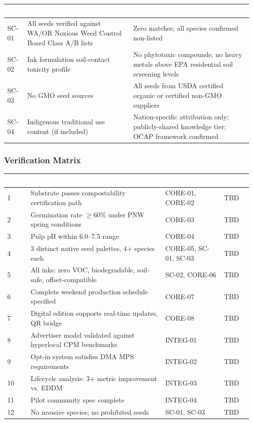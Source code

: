 \documentclass[11pt,letterpaper]{article}
\newcommand{\tableheader}[1]{\textbf{\sffamily\textcolor{white}{#1}}}
\begin{document}
\begin{center}
\begin{tabularx}{\textwidth}{C{1.2cm}L{3.5cm}X}
\toprule
{}
\tableheader{ID} & \tableheader{Verifies} & \tableheader{Expected Result} \\
\midrule
SC-01 & All seeds verified against WA/OR Noxious Weed Control Board Class A/B lists & Zero matches; all species confirmed non-listed \\
SC-02 & Ink formulation soil-contact toxicity profile & No phytotoxic compounds; no heavy metals above EPA residential soil screening levels \\
SC-03 & No GMO seed sources & All seeds from USDA certified organic or certified non-GMO suppliers \\
SC-04 & Indigenous traditional use content (if included) & Nation-specific attribution only; publicly-shared knowledge tier; OCAP framework confirmed \\
\bottomrule
\end{tabularx}
\end{center}

\subsubsection{Verification Matrix}

\begin{center}
\begin{tabularx}{\textwidth}{C{0.8cm}L{4.5cm}L{2.5cm}C{1.5cm}}
\toprule
{}
\tableheader{SC\#} & \tableheader{Success Criterion} & \tableheader{Test IDs} & \tableheader{Status} \\
 & Substrate passes compostability certification path & CORE-01, CORE-02 & TBD \\
2 & Germination rate $\geq$60\% under PNW spring conditions & CORE-03 & TBD \\
3 & Pulp pH within 6.0--7.5 range & CORE-04 & TBD \\
4 & 3 distinct native seed palettes, 4+ species each & CORE-05, SC-01, SC-03 & TBD \\
5 & All inks: zero VOC, biodegradable, soil-safe, offset-compatible & SC-02, CORE-06 & TBD \\
6 & Complete weekend production schedule specified & CORE-07 & TBD \\
7 & Digital edition supports real-time updates, QR bridge & CORE-08 & TBD \\
8 & Advertiser model validated against hyperlocal CPM benchmarks & INTEG-01 & TBD \\
9 & Opt-in system satisfies DMA MPS requirements & INTEG-02 & TBD \\
10 & Lifecycle analysis: 3+ metric improvement vs. EDDM & INTEG-03 & TBD \\
11 & Pilot community spec complete & INTEG-04 & TBD \\
12 & No invasive species; no prohibited seeds & SC-01, SC-03 & TBD \\
\bottomrule
\end{tabularx}
\end{center}
\end{document}
